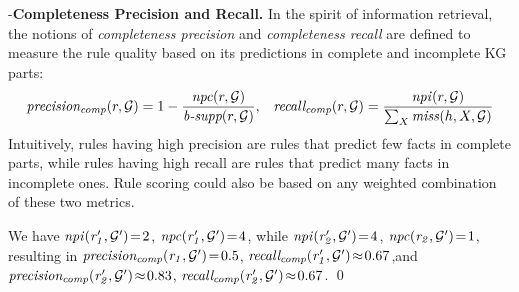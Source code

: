 \noindent -\textbf{Completeness Precision and Recall.} In the spirit of information retrieval, the notions of \emph{completeness precision} and \emph{completeness recall} are defined to measure the rule quality based on its predictions in complete and incomplete KG parts:
\begin{align*}
\mathit{precision_{comp}}(r,\mathcal{G})=1-\frac{\mathit{npc}(r,\mathcal{G})}{\textit{b-supp}(r,\mathcal{G})},\;\;\;
\mathit{recall_{comp}}(r,\mathcal{G})=\frac{\mathit{npi}(r,\mathcal{G})}{\sum_X \mathit{miss}(h,X,\mathcal{G})}
\end{align*}
Intuitively, rules having high precision are rules that predict few facts in complete parts, while rules having high recall are rules that predict many facts in incomplete ones. Rule scoring could also be based on any weighted combination of these two metrics.
\begin{example}
We have $\mathit{npi(r_1', \mathcal{G}')}\!=\!2$, $\mathit{npc(r_1', \mathcal{G}')}\!=\!4$, while $\mathit{npi(r_2',\mathcal{G}')}\!=\!4$, $\mathit{npc(r_2,\mathcal{G}')}\!=\!1$, resulting in $\mathit{precision_{comp}(r_1,\mathcal{G}')}\!=\!0.5$, $\mathit{recall_{comp}(r_1',\mathcal{G}')}\!\approx\!0.67$,and $\mathit{precision_{comp}(r_2',\mathcal{G}')}\!\approx\!0.83$, $\mathit{recall_{comp}(r_2',\mathcal{G}')}\!\approx\!0.67$.
\qed
\end{example}


